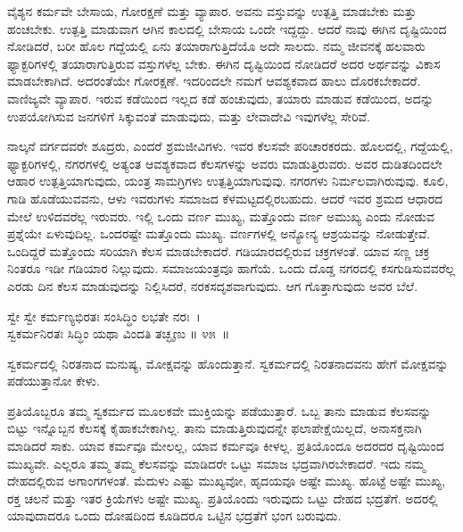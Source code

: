ವೈಶ್ಯನ ಕರ್ಮವೇ ಬೇಸಾಯ, ಗೋರಕ್ಷಣೆ ಮತ್ತು ವ್ಯಾಪಾರ. ಅವನು ವಸ್ತುವನ್ನು ಉತ್ಪತ್ತಿ ಮಾಡಬೇಕು ಮತ್ತು ಹಂಚಬೇಕು. ಉತ್ಪತ್ತಿ ಮಾಡುವಾಗ ಆಗಿನ ಕಾಲದಲ್ಲಿ ಬೇಸಾಯ ಒಂದೇ ಇದ್ದದ್ದು. ಆದರೆ ನಾವು ಈಗಿನ ದೃಷ್ಟಿಯಿಂದ ನೋಡಿದರೆ, ಬರೀ ಹೊಲ ಗದ್ದೆಯಲ್ಲಿ ಏನು ತಯಾರಾಗುತ್ತಿದೆಯೊ ಅದೇ ಸಾಲದು. ನಮ್ಮ ಜೀವನಕ್ಕೆ ಹಲವಾರು ಫ್ಯಾಕ್ಟರಿಗಳಲ್ಲಿ ತಯಾರಾಗುತ್ತಿರುವ ವಸ್ತುಗಳೆಲ್ಲ ಬೇಕು. ಈಗಿನ ದೃಷ್ಟಿಯಿಂದ ನೋಡಿದರೆ ಅದರ ಅರ್ಥವನ್ನು ವಿಕಾಸ ಮಾಡಬೇಕಾಗಿದೆ. ಅದರಂತೆಯೇ ಗೋರಕ್ಷಣೆ. ಇದರಿಂದಲೇ ನಮಗೆ ಆವಶ್ಯಕವಾದ ಹಾಲು ದೊರಕಬೇಕಾದರೆ. ವಾಣಿಜ್ಯವೇ ವ್ಯಾಪಾರ. ಇರುವ ಕಡೆಯಿಂದ ಇಲ್ಲದ ಕಡೆ ಹಂಚುವುದು, ತಯಾರು ಮಾಡುವ ಕಡೆಯಿಂದ, ಅದನ್ನು ಉಪಯೋಗಿಸುವ ಜನಗಳಿಗೆ ಸಿಕ್ಕುವಂತೆ ಮಾಡುವುದು, ಮತ್ತು ಲೇವಾದೇವಿ ಇವುಗಳೆಲ್ಲ ಸೇರಿವೆ.

ನಾಲ್ಕನೆ ವರ್ಗದವರೇ ಶೂದ್ರರು, ಎಂದರೆ ಶ್ರಮಜೀವಿಗಳು. ಇವರ ಕೆಲಸವೇ ಪರಿಚಾರಕ\-ರದು. ಹೊಲದಲ್ಲಿ, ಗದ್ದೆಯಲ್ಲಿ, ಫ್ಯಾಕ್ಟರಿಗಳಲ್ಲಿ, ನಗರಗಳಲ್ಲಿ ಅತ್ಯಂತ ಆವಶ್ಯಕವಾದ ಕೆಲಸಗಳನ್ನು ಅವರು ಮಾಡುತ್ತಿರುವರು. ಅವರ ದುಡಿತದಿಂದಲೇ ಆಹಾರ ಉತ್ಪತ್ತಿಯಾಗುವುದು, ಯಂತ್ರ ಸಾಮಗ್ರಿಗಳು ಉತ್ಪತ್ತಿಯಾಗುವುವು. ನಗರಗಳು ನಿರ್ಮಲವಾಗಿರುವುವು. ಕೂಲಿ, ಗಾಡಿ ಹೊಡೆಯುವವನು, ಆಳು ಇವರುಗಳು ಸಮಾಜದ ಕೆಳಮಟ್ಟದಲ್ಲಿರಬಹುದು. ಆದರೆ ಇವರ ಶ್ರಮದ ಆಧಾರದ ಮೇಲೆ ಉಳಿದವರೆಲ್ಲ ಇರುವರು. ಇಲ್ಲಿ ಒಂದು ವರ್ಣ ಮುಖ್ಯ, ಮತ್ತೊಂದು ವರ್ಣ ಅಮುಖ್ಯ ಎಂದು ನೋಡುವ ಪ್ರಶ್ನೆಯೇ ಏಳುವುದಿಲ್ಲ. ಒಂದರಷ್ಟೇ ಮತ್ತೊಂದು ಮುಖ್ಯ. ವರ್ಣಗಳಲ್ಲಿ ಅನ್ಯೋನ್ಯ ಆಶ್ರಯವನ್ನು ನೋಡುತ್ತೇವೆ. ಒಂದಿದ್ದರೆ ಮತ್ತೊಂದು ಸರಿಯಾಗಿ ಕೆಲಸ ಮಾಡಬೇಕಾದರೆ. ಗಡಿಯಾರದಲ್ಲಿರುವ ಚಕ್ರಗಳಂತೆ. ಯಾವ ಸಣ್ಣ ಚಕ್ರ ನಿಂತರೂ ಇಡೀ ಗಡಿಯಾರ ನಿಲ್ಲುವುದು. ಸಮಾಜಯಂತ್ರವೂ ಹಾಗೆಯೆ. ಒಂದು ದೊಡ್ಡ ನಗರದಲ್ಲಿ ಕಸಗುಡಿಸುವವರೆಲ್ಲ ಎರಡು ದಿನ ಕೆಲಸ ಮಾಡುವುದನ್ನು ನಿಲ್ಲಿಸಿದರೆ, ನರಕಸದೃಶವಾಗುವುದು. ಆಗ ಗೊತ್ತಾಗುವುದು ಅವರ ಬೆಲೆ.

\begin{shloka}
ಸ್ವೇ ಸ್ವೇ ಕರ್ಮಣ್ಯಭಿರತಃ ಸಂಸಿದ್ಧಿಂ ಲಭತೇ ನರಃ~।\\ಸ್ವಕರ್ಮನಿರತಃ ಸಿದ್ಧಿಂ ಯಥಾ ವಿಂದತಿ ತಚ್ಛೃಣು \hfill॥ ೪೫~॥
\end{shloka}

\begin{artha}
ಸ್ವಕರ್ಮದಲ್ಲಿ ನಿರತನಾದ ಮನುಷ್ಯ, ಮೋಕ್ಷವನ್ನು ಹೊಂದುತ್ತಾನೆ. ಸ್ವಕರ್ಮದಲ್ಲಿ ನಿರತನಾದವನು ಹೇಗೆ ಮೋಕ್ಷವನ್ನು ಪಡೆಯುತ್ತಾನೋ ಕೇಳು.
\end{artha}

ಪ್ರತಿಯೊಬ್ಬರೂ ತಮ್ಮ ಸ್ವಕರ್ಮದ ಮೂಲಕವೇ ಮುಕ್ತಿಯನ್ನು ಪಡೆಯುತ್ತಾರೆ. ಒಬ್ಬ ತಾನು ಮಾಡುವ ಕೆಲಸವನ್ನು ಬಿಟ್ಟು ಇನ್ನೊಬ್ಬನ ಕೆಲಸಕ್ಕೆ ಕೈಹಾಕಬೇಕಾಗಿಲ್ಲ. ತಾನು ಮಾಡುತ್ತಿರುವುದನ್ನೇ ಫಲಾಪೇಕ್ಷೆಯಿಲ್ಲದೆ, ಅನಾಸಕ್ತನಾಗಿ ಮಾಡಿದರೆ ಸಾಕು. ಯಾವ ಕರ್ಮವೂ ಮೇಲಲ್ಲ, ಯಾವ ಕರ್ಮವೂ ಕೀಳಲ್ಲ. ಪ್ರತಿಯೊಂದೂ ಅದರದರ ದೃಷ್ಟಿಯಿಂದ ಮುಖ್ಯವೇ. ಎಲ್ಲರೂ ತಮ್ಮ ತಮ್ಮ ಕೆಲಸವನ್ನು ಮಾಡಿದರೇ ಒಟ್ಟು ಸಮಾಜ ಭದ್ರವಾಗಿರಬೇಕಾದರೆ. ಇದು ನಮ್ಮ ದೇಹದಲ್ಲಿರುವ ಅಗಾಂಗಗಳಂತೆ. ಮೆದುಳು ಎಷ್ಟು ಮುಖ್ಯವೋ, ಹೃದಯವೂ ಅಷ್ಟೇ ಮುಖ್ಯ. ಹೊಟ್ಟೆ ಅಷ್ಟೇ ಮುಖ್ಯ, ರಕ್ತ ಚಲನೆ ಮತ್ತು ಇತರ ಕ್ರಿಯೆಗಳು ಅಷ್ಟೇ ಮುಖ್ಯ. ಪ್ರತಿಯೊಂದು ಇರುವುದು ಒಟ್ಟು ದೇಹದ ಭದ್ರತೆಗೆ. ಅದರಲ್ಲಿ ಯಾವುದಾದರೂ ಒಂದು ದೋಷದಿಂದ ಕೂಡಿದರೂ ಒಟ್ಟಿನ ಭದ್ರತೆಗೆ ಭಂಗ ಬರುವುದು.

